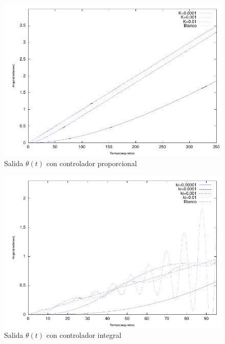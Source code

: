 \documentclass{sig-alternate}
\begin{document}
\begin{figure}[hp]
\label{mProporcional}
\centering
\includegraphics[scale=0.8]{graficos/mProporcional}
\caption{Salida $\theta(t)$ con controlador proporcional}
\end{figure}

\begin{figure}[hp]
\label{mIntegral}
\centering
\includegraphics[scale=0.8]{graficos/mIntegral}
\caption{Salida $\theta(t)$ con controlador integral}
\end{figure}
\end{document}
